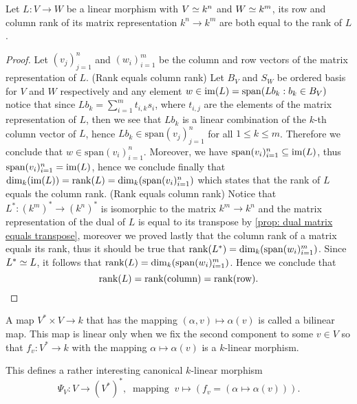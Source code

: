 \begin{proposition}
\label{prop: column and row rank equal the rank}
Let \(L: V \to W\) be a linear morphism with \(V \simeq k^n\) and \(W \simeq
k^m\), its row and column rank of its matrix representation \(k^n \to k^m\)
are both equal to the rank of \(L\).
\end{proposition}

\begin{proof}
Let \((v_j)_{j=1}^n\) and  \((w_i)_{i=1}^m\) be the column and row vectors of
the matrix representation of \(L\).
(Rank equals column rank) Let \(B_V\) and \(S_W\) be ordered basis for \(V\)
and \(W\) respectively and any element \(w \in \operatorname{im}(L) = \mathrm{span}(Lb_k :
b_k \in B_V)\) notice that since \(Lb_k = \sum_{i=1}^m t_{i, k} s_i\), where
\(t_{i,j}\) are the elements of the matrix representation of \(L\), then we
see that \(Lb_k\) is a linear combination of the \(k\)-th column vector of
\(L\), hence \(Lb_k \in \mathrm{span}(v_j)_{j=1}^n\) for all \(1 \leq k \leq
m\). Therefore we conclude that \(w \in \mathrm{span}(v_i)_{i=1}^n\).
Moreover, we have \(\mathrm{span}(v_i)_{i=1}^n \subseteq \operatorname{im}(L)\), thus
\(\mathrm{span}(v_i)_{i=1}^n = \operatorname{im}(L)\), hence we conclude finally that
\(\dim_k(\operatorname{im}(L)) = \operatorname{rank}(L) = \dim_k(\mathrm{span}(v_i)_{i=1}^n)\) which
states that the rank of \(L\) equals the column rank.
(Rank equals column rank) Notice that \(L^\ast : (k^m)^\ast \to (k^n)^\ast\)
is isomorphic to the matrix \(k^m \to k^n\) and the matrix representation of
the dual of \(L\) is equal to its transpose by \ref{prop: dual matrix equals
transpose}, moreover we proved lastly that the column rank of a matrix equals
its rank, thus it should be true that \(\operatorname{rank}(L^\ast) =
\dim_k(\mathrm{span}(w_i)_{i=1}^m)\). Since \(L^\ast \simeq L\), it follows that
\(\operatorname{rank}(L) = \dim_k(\mathrm{span}(w_i)_{i=1}^m)\). Hence we conclude that
\[
  \operatorname{rank}(L) = \operatorname{rank}(\text{column}) = \operatorname{rank}(\text{row}).
\]
\end{proof}

\begin{definition}\label{def: bilinear map}
A map \(V^\ast \times V \to k\) that has the mapping \((\alpha, v) \mapsto
\alpha(v)\) is called a bilinear map. This map is linear only when we fix the
second component to some \(v \in V\) so that \(f_v: V^\ast \to k\) with the
mapping \(\alpha \mapsto \alpha(v)\) is a \(k\)-linear morphism.
\end{definition}

This defines a rather interesting canonical \(k\)-linear morphism
\[
\Psi_V : V \to (V^\ast)^\ast,\
\text{ mapping }\ v \mapsto (f_v = (\alpha \mapsto \alpha(v))).
\]

